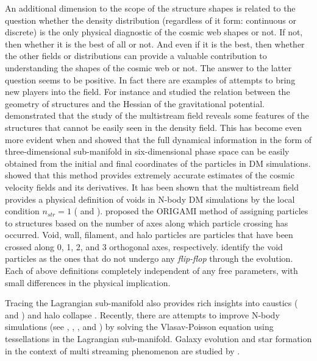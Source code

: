 \documentclass[fleqn,usenatbib,useAMS]{mnras}
\begin{document}
An additional dimension to the scope of the structure shapes is related to the question whether the density distribution (regardless of it form: continuous or discrete) is the only physical diagnostic of the cosmic web shapes or not. If not, then whether it is the best of all or not. And even if it is the best, then whether the other fields or distributions can provide a valuable contribution to understanding the shapes of the cosmic web or not. The answer to the latter question seems to be positive. In fact there are examples of attempts to bring new players into the field. For instance \cite{Hahn2007} and \cite{Forero-Romero2009a} studied the relation between the geometry of structures and the Hessian of the gravitational potential. \cite{Shandarin2011} demonstrated that the study of the multistream field reveals some features of the structures that cannot be easily seen in the density field. This has become even more evident when \cite{Shandarin2012} and \cite{Abel2012b} showed that the full dynamical information in the form of three-dimensional  sub-manifold in six-dimensional phase space can be easily obtained from the  initial and final coordinates of the particles in DM simulations. \cite{Hahn2015a} showed that this method provides extremely accurate estimates of the cosmic velocity fields and its derivatives. It has been shown that the multistream field provides a physical definition of voids in N-body DM simulations by the local condition $n_{str} = 1$ (\citealt{Shandarin2012} and \citealt{Ramachandra2015}). \cite{Falck2012} proposed the {ORIGAMI} method of assigning particles to  structures based on the number of axes along which particle crossing has occurred. Void, wall, filament, and halo particles are particles that have been crossed along 0, 1, 2, and 3 orthogonal axes, respectively. \cite{Shandarin2016} identify the void particles as the ones that do not undergo any {\it flip-flop} through the evolution. Each of above definitions completely independent of any free parameters, with small differences in the physical implication.

Tracing the Lagrangian sub-manifold also provides rich insights into caustics (\cite{Arnold1982} and \citealt{Hidding2014}) and halo collapse \cite{Neyrinck2015a}. Recently, there are attempts to improve N-body simulations (see \cite{Hahn2013}, \cite{Angulo2013a}, \cite{Angulo2013b}, \cite{Sousbie2015} and \cite{Hahn2016a}) by solving the Vlasav-Poisson equation using tessellations in the Lagrangian sub-manifold. Galaxy evolution and star formation in the context of multi streaming phenomenon are studied by \cite{Aragon-Calvo2016b}. 
\end{document}
